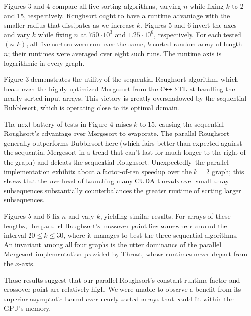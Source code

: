 \documentclass[letterpaper, 12pt]{article}
\begin{document}
Figures 3 and 4 compare all five sorting algorithms, varying $n$ while fixing $k$ to 2 and 15, respectively. Roughsort ought
  to have a runtime advantage with the smaller radius that dissipates as we increase $k$.
Figures 5 and 6 invert the axes and vary $k$ while fixing $n$ at $750 \cdot 10^3$ and $1.25 \cdot 10^6$, respectively. 
For each tested $(n, k)$, all five sorters were run over the same, $k$-sorted random array of length $n$; their runtimes were
  averaged over eight such runs.
The runtime axis is logarithmic in every graph.

Figure 3 demonstrates the utility of the sequential Roughsort algorithm, which beats even the highly-optimized Mergesort from
  the C\texttt{++} STL at handling the nearly-sorted input arrays.
This victory is greatly overshadowed by the sequential Bubblesort, which is operating close to its optimal domain.

The next battery of tests in Figure 4 raises $k$ to 15, causing the sequential Roughsort's advantage over Mergesort to evaporate.
The parallel Roughsort generally outperforms Bubblesort here (which fairs better than expected against the sequential Mergesort
  in a trend that can't last for much longer to the right of the graph) and defeats the sequential Roughsort.
Unexpectedly, the parallel implementation exhibits about a factor-of-ten speedup over the $k = 2$ graph; this shows that
  the overhead of launching many CUDA threads over small array subsequences substantially counterbalances the greater runtime
  of sorting larger subsequences.

Figures 5 and 6 fix $n$ and vary $k$, yielding similar results.
For arrays of these lengths, the parallel Roughsort's crossover point lies somewhere around the interval $20 \leq k \leq 30$,
  where it manages to best the three sequential algorithms.
An invariant among all four graphs is the utter dominance of the parallel Mergesort implementation provided by Thrust,
  whose runtimes never depart from the $x$-axis.

These results suggest that our parallel Roughsort's constant runtime factor and crossover point are relatively high.
We were unable to observe a benefit from its superior asymptotic bound over nearly-sorted arrays that could fit within the
GPU's memory.

\begin{sidewaysfigure}

\vspace{-4ex}
\caption{\label{fig:k2}{\em
  Sort Runtimes over Arrays of Length $n\cdot 10^6$, $k = 2$
}}
\end{sidewaysfigure}
\end{document}
